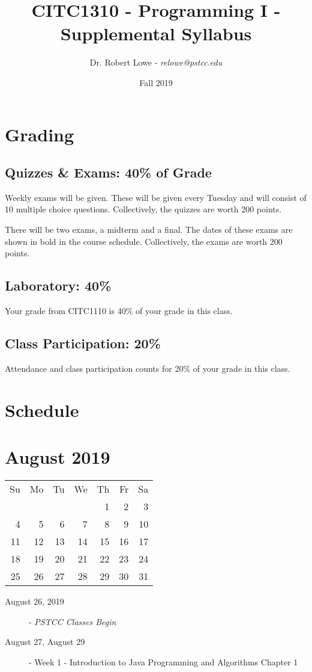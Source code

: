\documentclass{article}
\title{CITC1310 - Programming I - Supplemental Syllabus}
\author{Dr. Robert Lowe - {\em relowe@pstcc.edu}}
\date{Fall 2019}
\begin{document}
\maketitle

\section{Grading}
\subsection*{Quizzes \& Exams: 40\% of Grade}
Weekly exams will be given. These will be given every Tuesday and will
consist of 10 multiple choice questions. Collectively, the quizzes are
worth 200 points.

There will be two exams, a midterm and a final.  The dates of these
exams are shown in bold in the course schedule.  Collectively, the
exams are worth 200 points.

\subsection*{Laboratory: 40\%}
Your grade from CITC1110 is 40\% of your grade in this class.

\subsection*{Class Participation: 20\%}
Attendance and class participation counts for 20\% of your grade in
this class.

\section{Schedule}
\section*{August 2019}
\begin{tabular}{rrrrrrr}
Su & Mo & Tu & We & Th & Fr & Sa\\
   &    &    &    &  1 &  2 &  3\\
 4 &  5 &  6 &  7 &  8 &  9 & 10\\
11 & 12 & 13 & 14 & 15 & 16 & 17\\
18 & 19 & 20 & 21 & 22 & 23 & 24\\
25 & 26 & 27 & 28 & 29 & 30 & 31\\
\end{tabular}

\begin{description}
    \item[August 26, 2019] - {\em PSTCC Classes Begin}
    \item[August 27, August 29] - Week 1 - Introduction to Java Programming and Algorithms
        \newline Chapter 1
\end{description}
\end{document}
